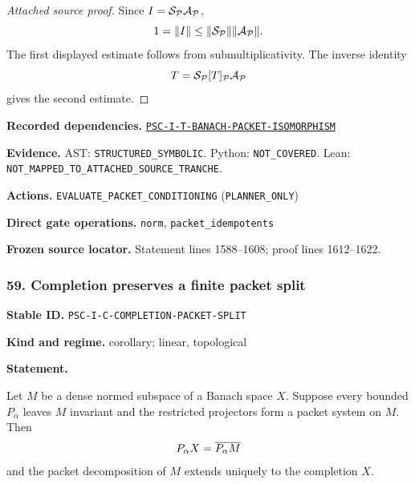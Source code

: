 \documentclass[a4paper,11pt]{article}
\newcommand{\field}[2]{\noindent\textbf{#1.} #2\par}
\begin{document}
\begin{proof}[Attached source proof]
Since $I=\mathcal S_{\mathcal P}\mathcal A_{\mathcal P}$,
\[
1=\|I\|\leq\|\mathcal S_{\mathcal P}\|\|\mathcal A_{\mathcal P}\|.
\]
The first displayed estimate follows from submultiplicativity.  The inverse identity
\[
T=\mathcal S_{\mathcal P}[T]_{\mathcal P}\mathcal A_{\mathcal P}
\]
gives the second estimate.
\end{proof}
\field{Recorded dependencies}{\hyperref[rec:PSC-I-T-BANACH-PACKET-ISOMORPHISM]{\nolinkurl{PSC-I-T-BANACH-PACKET-ISOMORPHISM}}}
\field{Evidence}{AST: \nolinkurl{STRUCTURED_SYMBOLIC}. Python: \nolinkurl{NOT_COVERED}. Lean: \nolinkurl{NOT_MAPPED_TO_ATTACHED_SOURCE_TRANCHE}.}
\field{Actions}{\nolinkurl{EVALUATE_PACKET_CONDITIONING} (\nolinkurl{PLANNER_ONLY})}
\field{Direct gate operations}{\nolinkurl{norm}, \nolinkurl{packet_idempotents}}
\field{Frozen source locator}{Statement lines 1588--1608; proof lines 1612--1622.}
\subsubsection*{59. Completion preserves a finite packet split}
\label{rec:PSC-I-C-COMPLETION-PACKET-SPLIT}
\field{Stable ID}{\nolinkurl{PSC-I-C-COMPLETION-PACKET-SPLIT}}
\field{Kind and regime}{corollary; linear, topological}
\textbf{Statement.}\par
Let $M$ be a dense normed subspace of a Banach space $X$.  Suppose every bounded $P_\alpha$ leaves $M$ invariant and the restricted projectors form a packet system on $M$.  Then
\[
P_\alpha X=\overline{P_\alpha M}
\]
and the packet decomposition of $M$ extends uniquely to the completion $X$.
\end{document}
